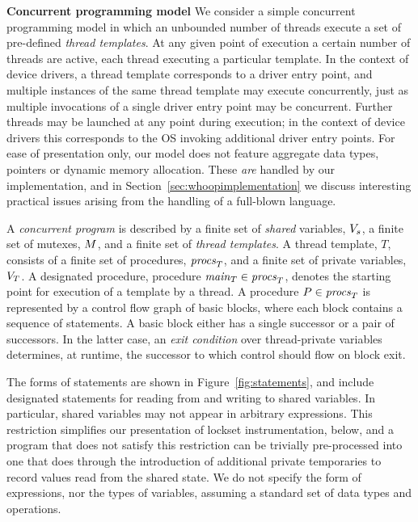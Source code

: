 \medskip\noindent\textbf{Concurrent programming model }
%
We consider a simple concurrent programming model in which an
unbounded number of threads execute a set of pre-defined \emph{thread
  templates}.  At any given point of execution a certain number of
threads are active, each thread executing a particular template.  In
the context of device drivers, a thread template corresponds to a
driver entry point, and multiple instances of the same thread template
may execute concurrently, just as multiple invocations of a single
driver entry point may be concurrent.  Further threads may be launched
at any point during execution; in the context of device drivers this
corresponds to the OS invoking additional driver entry points.  For
ease of presentation only, our model does not feature aggregate data
types, pointers or dynamic memory allocation.  These \emph{are}
handled by our implementation, and in
Section~\ref{sec:whoopimplementation} we discuss interesting practical
issues arising from the handling of a full-blown language.

A \emph{concurrent program} is described by a finite set of
\emph{shared} variables, $V_s$, a finite set of mutexes,
$M$, and a finite set of \emph{thread templates}.  A thread
template, $T$, consists of a finite set of procedures,
$\mathit{procs}_{T}$, and a finite set of private variables,
$V_{T}$.  A designated procedure, procedure $\mathit{main}_{T}
\in \mathit{procs}_{T}$, denotes the starting point for execution of a
template by a thread.  A procedure $P \in \mathit{procs}_{T}$ is
represented by a control flow graph of basic blocks, where each block
contains a sequence of statements.  A basic block either has a single
successor or a pair of successors.  In the latter case, an \emph{exit
  condition} over thread-private variables determines, at runtime, the
successor to which control should flow on block exit.

The forms of statements are shown in Figure~\ref{fig:statements}, and
include designated statements for reading from and writing to shared
variables.  In particular, shared variables may not appear in
arbitrary expressions.  This restriction simplifies our presentation
of lockset instrumentation, below, and a program that does not satisfy
this restriction can be trivially pre-processed into one that does
through the introduction of additional private temporaries to record
values read from the shared state.  We do not specify the form of
expressions, nor the types of variables, assuming a standard set of
data types and operations.


